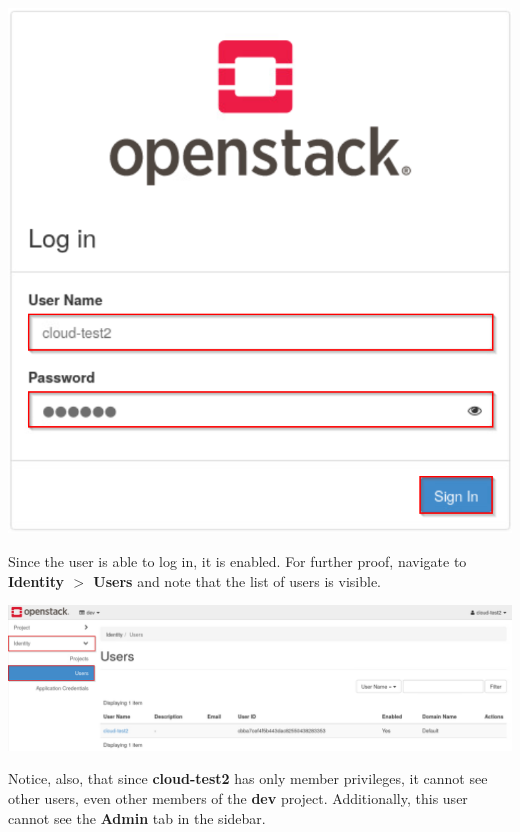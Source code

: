 \documentclass[letterpaper, 12pt]{article}
\begin{document}
\begin{enumerate}
\begin{labstep}
        \begin{center}
            \includegraphics[scale=0.5]{images/part3/step10.png}
        \end{center}
    \end{labstep}

    \begin{labstep}
        Since the user is able to log in, it is enabled.
        For further proof, navigate to \textbf{Identity $>$ Users} and note that the list of users is visible.

        \begin{center}
            \includegraphics[width=\linewidth]{images/part3/step11.png}
        \end{center}
    \end{labstep}

    \begin{notebox}
        Notice, also, that since \textbf{cloud-test2} has only member privileges, it cannot see other users, even other members of the \textbf{dev} project.
        Additionally, this user cannot see the \textbf{Admin} tab in the sidebar.
    \end{notebox}


\end{enumerate}
\end{document}

